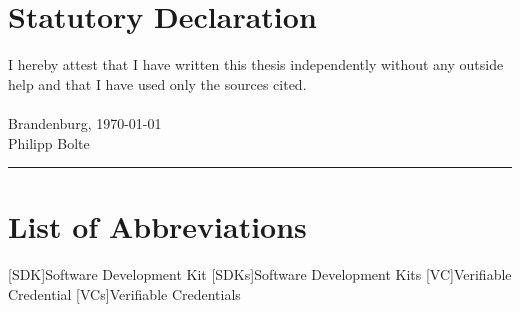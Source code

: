 
\usepackage[utf8]{inputenc}

\newcommand*{\mytitle}{Self-sovereign Identity: \\Development of an Implementation-based Evaluation Framework for Verifiable Credential SDKs} %
\newcommand*{\myinstitute}{Brandenburg University of Applied Sciences} %
\newcommand*{\myfaculty}{Department of Economics} %
\newcommand*{\myauthor}{Philipp Bolte} %
\newcommand*{\myreporttype}{Master's Thesis} %
\newcommand*{\mydate}{\today} %




	
\pagestyle{empty}

\newpage 					%
\thispagestyle{empty}
\quad 
\newpage
{}
 
\cleardoubleoddpage


\chapter*{Statutory Declaration}
I hereby attest that I have written this thesis independently without any outside help and that I have used only the sources cited. \\~\\
Brandenburg, \today\\[.6cm]
Philipp Bolte\\
\rule[0.5em]{20em}{0.5pt}



\tableofcontents			%
\listoffigures				%
\listoftables				%
\chapter*{List of Abbreviations}
    \begin{acronym}[SDK]
        [SDK]{Software Development Kit}
        [SDKs]{Software Development Kits}
        [VC]{Verifiable Credential}
        [VCs]{Verifiable Credentials}
    \end{acronym}

\pagestyle{fancy}







\newpage
\lhead{}
\rhead{\leftmark}


\appendix




